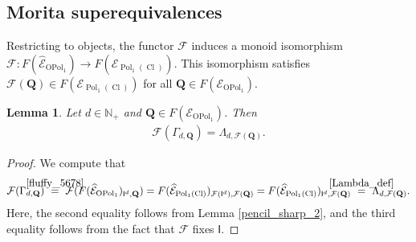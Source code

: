\documentclass[11pt]{amsart}
\newcommand\go{\mathsf{I}}              %
\newtheorem{lem}[theo]{Lemma}
\theoremstyle{definition}
\numberwithin{equation}{section}
\begin{document}
\subsection{Morita superequivalences}


Restricting to objects, the functor $ \mathcal{F} $ induces a monoid isomorphism $ \mathcal{F} \colon F(\widehat{\mathcal{E}}_{\operatorname{OPol}_{1}}) \rightarrow F(\widehat{\mathcal{E}}_{\operatorname{Pol}_{1}(\operatorname{Cl})}) $. This isomorphism satisfies $ \mathcal{F}(\mathbf{Q}) \in F(\mathcal{E}_{\operatorname{Pol}_{1}(\operatorname{Cl})}) $ for all $ \mathbf{Q} \in F(\mathcal{E}_{\operatorname{OPol}_{1}}) $.

\begin{lem}
Let $ d \in \mathbb{N}_{+} $ and $ \mathbf{Q} \in F(\mathcal{E}_{\operatorname{OPol}_{1}}) $. Then 
\begin{gather} \label{warm_weather}
\mathcal{F}(\Gamma_{d,\mathbf{Q}}) = \Lambda_{d,\mathcal{F}(\mathbf{Q})}.
\end{gather}
\end{lem}

\begin{proof}
We compute that 
\begin{gather*} 
\mathcal{F}(\Gamma_{d,\mathbf{Q}}) \ \stackrel{\mathclap{\cref{fluffy_5678}}}{=} \ \mathcal{F}(F(\widehat{\mathcal{E}}_{\operatorname{OPol}_{1}})_{\go^{d},\mathbf{Q}}) = F(\widehat{\mathcal{E}}_{\operatorname{Pol}_{1}(\operatorname{Cl})})_{\mathcal{F}(\go^{d}),\mathcal{F}(\mathbf{Q})} = F(\widehat{\mathcal{E}}_{\operatorname{Pol}_{1}(\operatorname{Cl})})_{\go^{d},\mathcal{F}(\mathbf{Q})} \ \stackrel{\mathclap{\cref{Lambda_def}}}{=} \ \Lambda_{d,\mathcal{F}(\mathbf{Q})}.
\end{gather*}
Here, the second equality follows from Lemma \ref{pencil_sharp_2}, and the third equality follows from the fact that $ \mathcal{F} $ fixes $ \go $.
\end{proof}
\end{document}
